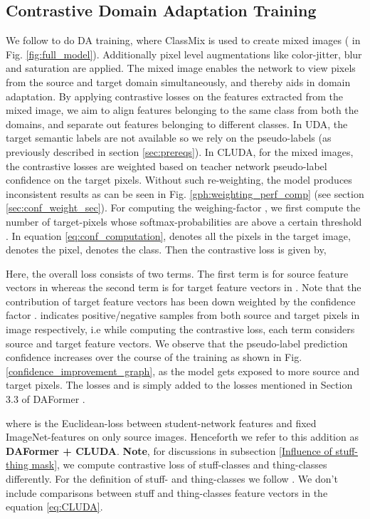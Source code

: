 \documentclass{article}
\begin{document}
\subsection{Contrastive Domain Adaptation Training}\label{sec:da}
We follow \cite{tranheden2021dacs} to do DA training, where ClassMix \cite{olsson2021classmix} is used to create mixed images ( in Fig. \ref{fig:full_model}). Additionally pixel level augmentations like color-jitter, blur and saturation are applied. The mixed image  enables the network to view pixels from the source and target domain simultaneously, and thereby aids in domain adaptation. 
By applying contrastive losses on the features extracted from the mixed image, we aim to align features belonging
to the same class from both the domains, and separate out features belonging to different classes. In UDA, the target semantic labels are not available so we rely on the pseudo-labels (as previously described in section \ref{sec:prereqs}). In CLUDA, for the mixed images, the contrastive losses are weighted based on teacher network pseudo-label confidence on the target pixels. Without such re-weighting, the model produces inconsistent results as can be seen in Fig. \ref{gph:weighting_perf_comp} (see section \ref{sec:conf_weight_sec}). For computing the weighing-factor , we first compute the number of target-pixels whose softmax-probabilities  are above a certain threshold . 
In equation \ref{eq:conf_computation},  denotes all the pixels in the target image,  denotes the pixel,  denotes the class. Then the contrastive loss is given by,




Here, the overall loss consists of two terms. The first term is for source feature vectors  in  whereas the second term is for target feature vectors  in . Note that the contribution of target feature vectors has been down weighted by the confidence factor .  indicates positive/negative samples from both source and target pixels in  image respectively, i.e while computing the contrastive loss, each term considers source and target feature vectors. We observe that the pseudo-label prediction confidence increases over the course of the training as shown in Fig. \ref{confidence_improvement_graph},
as the model gets exposed to more source and target pixels. The losses  and  is simply added to the losses mentioned in Section 3.3 of DAFormer \cite{hoyer2021daformer}.

where  is the Euclidean-loss between student-network features and fixed ImageNet-features on only source images. Henceforth we refer to this addition as \textbf{DAFormer \cite{hoyer2021daformer} + CLUDA}. \textbf{Note}, for discussions in subsection \ref{Influence of stuff-thing mask}, we compute contrastive loss of stuff-classes and thing-classes differently. For the definition of stuff- and thing-classes we follow \cite{caesar2018coco}. We don't include comparisons between stuff and thing-classes feature vectors in the equation \ref{eq:CLUDA}.
\end{document}
